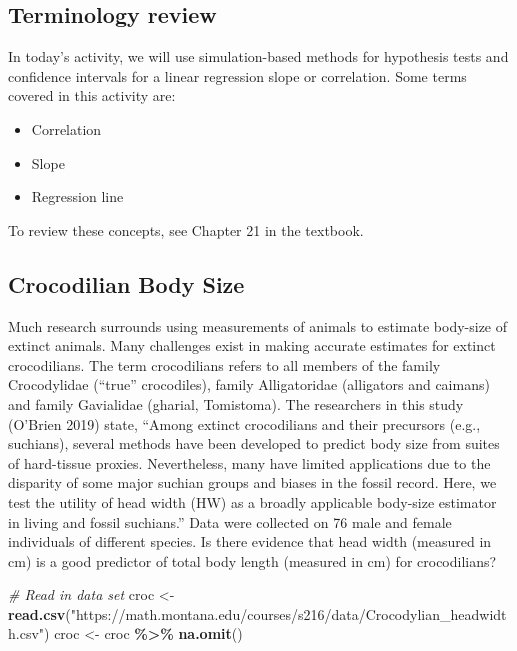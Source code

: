 \documentclass[
]{report}
\newenvironment{Shaded}{\begin{snugshade}}{\end{snugshade}}
\newcommand{\CommentTok}[1]{\textcolor[rgb]{0.56,0.35,0.01}{\textit{#1}}}
\newcommand{\FunctionTok}[1]{\textcolor[rgb]{0.13,0.29,0.53}{\textbf{#1}}}
\newcommand{\NormalTok}[1]{#1}
\newcommand{\OtherTok}[1]{\textcolor[rgb]{0.56,0.35,0.01}{#1}}
\newcommand{\SpecialCharTok}[1]{\textcolor[rgb]{0.81,0.36,0.00}{\textbf{#1}}}
\newcommand{\StringTok}[1]{\textcolor[rgb]{0.31,0.60,0.02}{#1}}
\begin{document}
\hypertarget{terminology-review-23}{%
\subsection{Terminology review}\label{terminology-review-23}}

In today's activity, we will use simulation-based methods for hypothesis tests and confidence intervals for a linear regression slope or correlation. Some terms covered in this activity are:

\begin{itemize}
\item
  Correlation
\item
  Slope
\item
  Regression line
\end{itemize}

To review these concepts, see Chapter 21 in the textbook.

\hypertarget{crocodilian-body-size}{%
\subsection{Crocodilian Body Size}\label{crocodilian-body-size}}

Much research surrounds using measurements of animals to estimate body-size of extinct animals. Many challenges exist in making accurate estimates for extinct crocodilians. The term crocodilians refers to all members of the family Crocodylidae (``true'' crocodiles), family Alligatoridae (alligators and caimans) and family Gavialidae (gharial, Tomistoma). The researchers in this study (O'Brien 2019) state, ``Among extinct crocodilians and their precursors (e.g., suchians), several methods have been developed to predict body size from suites of hard-tissue proxies. Nevertheless, many have limited applications due to the disparity of some major suchian groups and biases in the fossil record. Here, we test the utility of head width (HW) as a broadly applicable body-size estimator in living and fossil suchians.'' Data were collected on 76 male and female individuals of different species. Is there evidence that head width (measured in cm) is a good predictor of total body length (measured in cm) for crocodilians?

\begin{Shaded}
\begin{Highlighting}[]
\CommentTok{\# Read in data set}
\NormalTok{croc }\OtherTok{\textless{}{-}} \FunctionTok{read.csv}\NormalTok{(}\StringTok{"https://math.montana.edu/courses/s216/data/Crocodylian\_headwidth.csv"}\NormalTok{)}
\NormalTok{croc }\OtherTok{\textless{}{-}}\NormalTok{ croc }\SpecialCharTok{\%\textgreater{}\%}
    \FunctionTok{na.omit}\NormalTok{()}
\end{Highlighting}
\end{Shaded}
\end{document}
